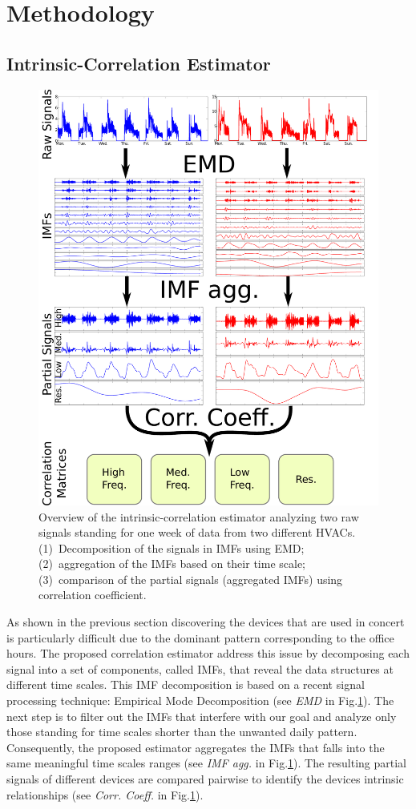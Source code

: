
\section{Methodology}

\subsection{Intrinsic-Correlation Estimator} \label{methodo:est}

\begin{figure}[t!]
 \includegraphics[width=.5\textwidth]{img/estimator.pdf}
 \caption{Overview of the intrinsic-correlation estimator analyzing two raw signals standing for one week of data from two different HVACs. (1)~Decomposition of the signals in IMFs using EMD; (2)~aggregation of the IMFs based on their time scale; (3)~comparison of the partial signals (aggregated IMFs) using correlation coefficient.}
 \label{fig:diagram1}
\end{figure}

As shown in the previous section discovering the devices that are used in concert is particularly difficult due to the dominant pattern corresponding to the office hours.
The proposed correlation estimator address this issue by decomposing each signal into a set of components, called IMFs, that reveal the data structures at different time scales.
This IMF decomposition is based on a recent signal processing technique: Empirical Mode Decomposition (see \emph{EMD} in Fig.\ref{fig:diagram1}).
The next step is to filter out the IMFs that interfere with our goal and analyze only those standing for time scales shorter than the unwanted daily pattern.
Consequently, the proposed estimator aggregates the IMFs that falls into the same meaningful time scales ranges (see \emph{IMF agg.} in Fig.\ref{fig:diagram1}).
The resulting partial signals of different devices are compared pairwise to identify the devices intrinsic relationships (see \emph{Corr. Coeff.} in Fig.\ref{fig:diagram1}). 

